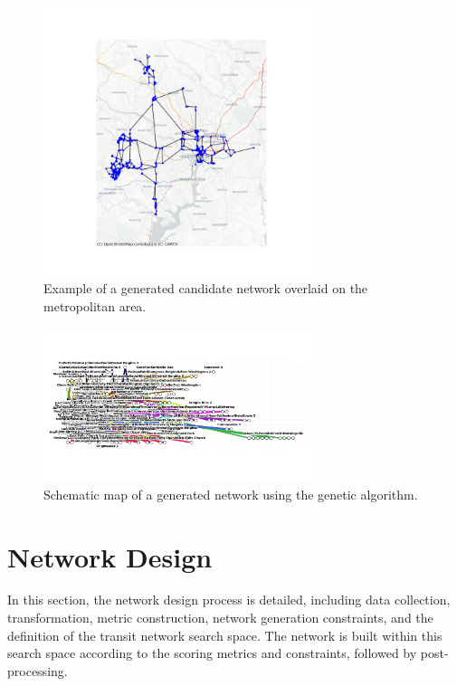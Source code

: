 \documentclass[manuscript]{acmart}
\begin{document}
\begin{figure}[h]
    \centering
    \includegraphics[width=0.7\textwidth]{img/network_map.png}
    \caption{Example of a generated candidate network overlaid on the metropolitan area.}
    \label{fig:networkmap}
\end{figure}


\begin{figure}[h]
    \centering
    \includegraphics[width=0.7\textwidth]{img/lines_genetic.png}
    \caption{Schematic map of a generated network using the genetic algorithm.}
    \label{fig:schematic}
\end{figure}

\section{Network Design}

In this section, the network design process is detailed, including data collection, transformation, metric construction, network generation constraints, and the definition of the transit network search space. The network is built within this search space according to the scoring metrics and constraints, followed by post-processing.
\end{document}
